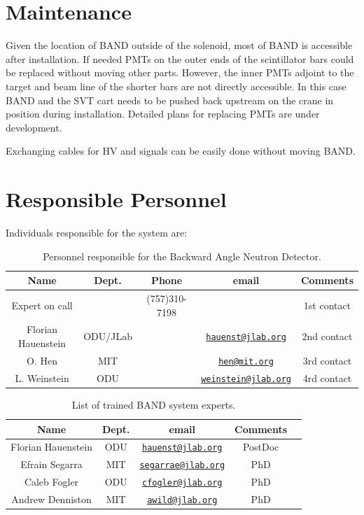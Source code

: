 \documentclass[12pt,letterpaper]{article}
\begin{document}
\section{Maintenance}
Given the location of BAND outside of the solenoid, most of BAND is accessible after installation. If needed PMTs on the outer ends of the scintillator bars could be replaced without moving other parts. However, the inner PMTs adjoint to the target and beam line of the shorter bars are not directly accessible. In this case BAND and the SVT cart needs to be pushed back upstream on the crane in position during installation.
Detailed plans for replacing PMTs are under development.

Exchanging cables for HV and signals can be easily done without moving BAND.

\section{Responsible Personnel}
\label{sec:personnel}
Individuals responsible for the system are:

\begin{table}[!htb]
 \centering
 \begin{tabular}{|c|c|c|c|c|}
\hline
 Name&Dept.&Phone&email&Comments \\ \hline
 Expert on call &  & (757)310-7198 & & 1st contact \\ \hline
Florian Hauenstein & ODU/JLab & & \href{mailto:hauenst@jlab.org}{\nolinkurl{hauenst@jlab.org}} & 2nd contact \\ \hline
O. Hen & MIT & &\href{mailto:hen@mit.org}{\nolinkurl{hen@mit.org}}& 3rd contact \\ \hline
L. Weinstein & ODU &  &\href{mailto:weinstein@jlab.org}{\nolinkurl{weinstein@jlab.org}}& 4rd  contact  \\ \hline

\end{tabular}
\caption{Personnel responsible for the Backward Angle Neutron Detector.} 
\label{table:personnelband}
\end{table}


\begin{table}[!htb]
 \centering
 \begin{tabular}{|c|c|c|c|c|}
\hline
 Name&Dept.& email&Comments \\ \hline
Florian Hauenstein & ODU &  \href{mailto:hauenst@jlab.org}{\nolinkurl{hauenst@jlab.org}} & PostDoc \\ \hline
Efrain Segarra & MIT & \href{mailto:segarrae@jlab.org}{\nolinkurl{segarrae@jlab.org}}& PhD \\ \hline
Caleb Fogler & ODU &  \href{mailto:cfogler@jlab.org}{\nolinkurl{cfogler@jlab.org}}& PhD  \\ \hline
Andrew Denniston & MIT &  \href{mailto:awild@jlab.org}{\nolinkurl{awild@jlab.org}}& PhD \\ \hline

\end{tabular}
\caption{List of trained BAND system experts.} 
\label{table:expertsband}
\end{table}
\end{document}
